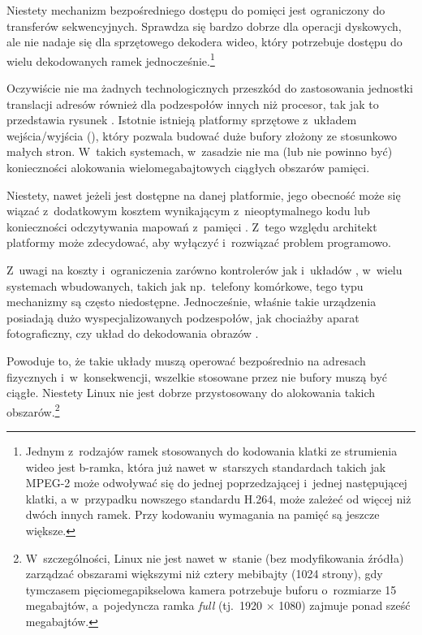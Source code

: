 Niestety mechanizm bezpośredniego dostępu do pomięci jest ograniczony
do transferów sekwencyjnych.  Sprawdza się bardzo dobrze dla operacji
dyskowych, ale nie nadaje się dla sprzętowego dekodera wideo, który
potrzebuje dostępu do wielu dekodowanych ramek
jednocześnie.\footnote{Jednym z~rodzajów ramek stosowanych do
  kodowania klatki ze strumienia wideo jest b-ramka, która już nawet
  w~starszych standardach takich jak MPEG-2 może odwoływać się do
  jednej poprzedzającej i~jednej następującej klatki, a w~przypadku
  nowszego standardu H.264, może zależeć od więcej niż dwóch innych
  ramek.  Przy kodowaniu wymagania na pamięć są jeszcze większe.}

Oczywiście nie ma żadnych technologicznych przeszkód do zastosowania
jednostki translacji adresów również dla podzespołów innych niż
procesor, tak jak to przedstawia rysunek .
Istotnie istnieją platformy sprzętowe z~układem 
wejścia/wyjścia (), który pozwala budować duże bufory
złożony ze stosunkowo małych stron.  W~takich systemach, w~zasadzie
nie ma (lub nie powinno być) konieczności alokowania
wielomegabajtowych ciągłych obszarów pamięci.

Niestety, nawet jeżeli  jest dostępne na danej platformie, jego
obecność może się wiązać z~dodatkowym kosztem wynikającym
z~nieoptymalnego kodu \autocite{bib:price-of-safety} lub konieczności
odczytywania mapowań z~pamięci
\autocite{bib:mitigate-iotlb-bottleneck}.  Z~tego względu architekt
platformy może zdecydować, aby wyłączyć  i~rozwiązać problem
programowo.

Z~uwagi na koszty i~ograniczenia zarówno kontrolerów  jak
i~układów , w~wielu systemach wbudowanych, takich jak
np.\ telefony komórkowe, tego typu mechanizmy są często niedostępne.
Jednocześnie, właśnie takie urządzenia posiadają dużo
wyspecjalizowanych podzespołów, jak chociażby aparat fotograficzny,
czy układ do dekodowania obrazów .

Powoduje to, że takie układy muszą operować bezpośrednio na adresach
fizycznych i~w~konsekwencji, wszelkie stosowane przez nie bufory muszą
być ciągłe.  Niestety Linux nie jest dobrze przystosowany do
alokowania takich obszarów.\footnote{W~szczególności, Linux nie jest
  nawet w~stanie (bez modyfikowania źródła) zarządzać obszarami
  większymi niż cztery mebibajty (1024 strony), gdy tymczasem
  pięciomegapikselowa kamera potrzebuje buforu o~rozmiarze 15
  megabajtów, a~pojedyncza ramka \textit{full } (tj.\ 1920
  $\times$ 1080) zajmuje ponad sześć megabajtów.}


